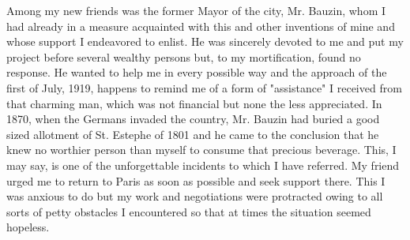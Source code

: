 \documentclass[a4paper,12pt,english,twoside,openright]{memoir}
\begin{document}
Among my new friends was the former Mayor of the city, Mr. Bauzin, whom I had already in a 
measure acquainted with this and other inventions of mine and whose support I endeavored to 
enlist.  He was sincerely devoted to me and put my project before several wealthy persons but, to 
my mortification, found no response.  He wanted to help me in every possible way and the 
approach of the first of July, 1919, happens to remind me of a form of "assistance" I received 
from that charming man, which was not financial but none the less appreciated.  In 1870, when 
the Germans invaded the country, Mr. Bauzin had buried a good sized allotment of St. Estephe of 
1801 and he came to the conclusion that he knew no worthier person than myself to consume 
that precious beverage.  This, I may say, is one of the unforgettable incidents to which I have 
referred.  My friend urged me to return to Paris as soon as possible and seek support there.  This 
I was anxious to do but my work and negotiations were protracted owing to all sorts of petty 
obstacles I encountered so that at times the situation seemed hopeless.  
\end{document}
